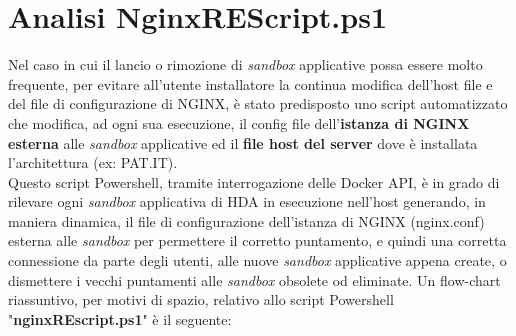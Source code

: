 \section{Analisi NginxREScript.ps1}
Nel caso in cui il lancio o rimozione di \textit{sandbox} applicative possa essere molto frequente, per evitare all'utente installatore la continua modifica dell'host file e del file di configurazione di NGINX, è stato predisposto uno script automatizzato che modifica, ad ogni sua esecuzione, il config file dell'\textbf{istanza di NGINX esterna} alle \textit{sandbox} applicative ed il \textbf{file host del server} dove è installata l'architettura (ex: PAT.IT).\\
Questo script Powershell, tramite interrogazione delle Docker API, è in grado di rilevare ogni \textit{sandbox} applicativa di HDA in esecuzione nell'host generando, in maniera dinamica, il file di configurazione dell'istanza di NGINX (nginx.conf) esterna alle \textit{sandbox} per permettere il corretto puntamento, e quindi una corretta connessione da parte degli utenti, alle nuove \textit{sandbox} applicative appena create, o dismettere i vecchi puntamenti alle \textit{sandbox} obsolete od eliminate. 
Un flow-chart riassuntivo, per motivi di spazio, relativo allo script Powershell "\textbf{nginxREscript.ps1}" è il seguente:
